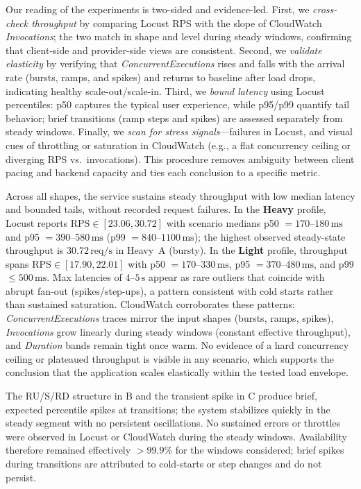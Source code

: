 \documentclass[11pt,a4paper]{article}
\begin{document}
Our reading of the experiments is two-sided and evidence-led. First, we \emph{cross-check throughput} by comparing Locust RPS with the slope of CloudWatch \emph{Invocations}; the two match in shape and level during steady windows, confirming that client-side and provider-side views are consistent. Second, we \emph{validate elasticity} by verifying that \emph{ConcurrentExecutions} rises and falls with the arrival rate (bursts, ramps, and spikes) and returns to baseline after load drops, indicating healthy scale-out/scale-in. Third, we \emph{bound latency} using Locust percentiles: p50 captures the typical user experience, while p95/p99 quantify tail behavior; brief transitions (ramp steps and spikes) are assessed separately from steady windows. Finally, we \emph{scan for stress signals}—failures in Locust, and visual cues of throttling or saturation in CloudWatch (e.g., a flat concurrency ceiling or diverging RPS vs.\ invocations). This procedure removes ambiguity between client pacing and backend capacity and ties each conclusion to a specific metric.

Across all shapes, the service sustains steady throughput with low median latency and bounded tails, without recorded request failures. In the \textbf{Heavy} profile, Locust reports \(\text{RPS} \in [23.06, 30.72]\) with scenario medians p50 \(=170\text{--}180\,\mathrm{ms}\) and p95 \(=390\text{--}580\,\mathrm{ms}\) (p99 \(=840\text{--}1100\,\mathrm{ms}\)); the highest observed steady-state throughput is \(\mathbf{30.72}\,\mathrm{req/s}\) in Heavy~A (bursty). In the \textbf{Light} profile, throughput spans \(\text{RPS} \in [17.90, 22.01]\) with p50 \(=170\text{--}330\,\mathrm{ms}\), p95 \(=370\text{--}480\,\mathrm{ms}\), and p99 \(\le 500\,\mathrm{ms}\). Max latencies of \(4\text{--}5\,\mathrm{s}\) appear as rare outliers that coincide with abrupt fan-out (spikes/step-ups), a pattern consistent with cold starts rather than sustained saturation. CloudWatch corroborates these patterns: \emph{ConcurrentExecutions} traces mirror the input shapes (bursts, ramps, spikes), \emph{Invocations} grow linearly during steady windows (constant effective throughput), and \emph{Duration} bands remain tight once warm. No evidence of a hard concurrency ceiling or plateaued throughput is visible in any scenario, which supports the conclusion that the application scales elastically within the tested load envelope.

The RU/S/RD structure in B and the transient spike in C produce brief, expected percentile spikes at transitions; the system stabilizes quickly in the steady segment with no persistent oscillations.
No sustained errors or throttles were observed in Locust or CloudWatch during the steady windows. Availability therefore remained effectively \(> 99.9\%\) for the windows considered; brief spikes during transitions are attributed to cold-starts or step changes and do not persist.
\end{document}

